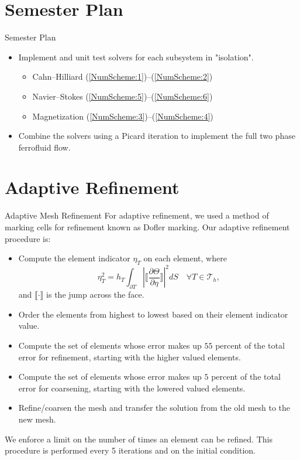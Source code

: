 \documentclass[9pt]{beamer}
\newcommand{\abs}[1]{\left\vert#1\right\vert}
\begin{document}
\section{Semester Plan}
\begin{frame}{Semester Plan}
	\begin{itemize}
		\item Implement and unit test solvers for each subsystem in "isolation".
		\vspace{.1in}
		\begin{itemize}
			\item Cahn--Hilliard (\ref{NumScheme:1})--(\ref{NumScheme:2})
			\vspace{.1in}
			\item Navier--Stokes (\ref{NumScheme:5})--(\ref{NumScheme:6})
			\vspace{.1in}
			\item Magnetization (\ref{NumScheme:3})--(\ref{NumScheme:4})
		\end{itemize}
		\vspace{.1in}
		\item Combine the solvers using a Picard iteration to implement the full two phase ferrofluid flow.
	\end{itemize}
\end{frame}

\section{Adaptive Refinement}
\begin{frame}{Adaptive Mesh Refinement}
	For adaptive refinement, we used a method of marking cells for refinement known as Dofler marking. Our adaptive refinement procedure is:
	\begin{itemize}
		\item Compute the element indicator $\eta_T$ on each element, where 
		$$
			\eta_T^2 = h_T\int_{\partial T}\abs{\bigg\llbracket\frac{\partial \Theta}{\partial \eta}\bigg\rrbracket}^2dS \quad \forall T\in\mathcal{T}_h,
		$$
		and $\llbracket\cdot\rrbracket$ is the jump across the face.
		\item Order the elements from highest to lowest based on their element indicator value.
		\item Compute the set of elements whose error makes up $55$ percent of the total error for refinement, starting with the higher valued elements.
		\item Compute the set of elements whose error makes up $5$ percent of the total error for coarsening, starting with the lowered valued elements.
		\item Refine/coarsen the mesh and transfer the solution from the old mesh to the new mesh.
	\end{itemize}
	We enforce a limit on the number of times an element can be refined. This procedure is performed every 5 iterations and on the initial condition.
\end{frame}
\end{document}
